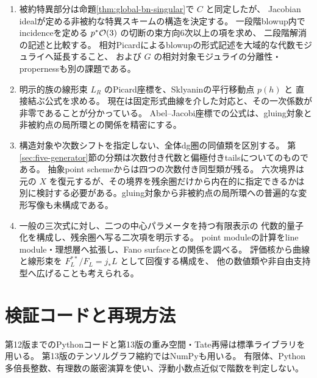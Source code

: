 \begin{enumerate}
 \item 被約特異部分は命題\ref{thm:global-bn-singular}で $C$ と同定したが、
 Jacobian idealが定める非被約な特異スキームの構造を決定する。
 一段階blowup内でincidenceを定める $p^*\mathcal O(3)$ の切断の束方向6次以上の項を求め、
 二段階解消の記述と比較する。
 相対Picardによるblowupの形式記述を大域的な代数モジュライへ延長すること、
 および $G$ の相対対象モジュライの分離性・propernessも別の課題である。
 \item 明示的族の線形束 $L_R$ のPicard座標を、Sklyaninの平行移動点 $p(h)$ と
 直接結ぶ公式を求める。
 現在は固定形式曲線を介した対応と、その一次係数が非零であることが分かっている。
 Abel--Jacobi座標での公式は、gluing対象と非被約点の局所環との関係を精密にする。
 \item 構造対象や次数シフトを指定しない、全体dg圏の同値類を区別する。
 第\ref{sec:five-generator}節の分類は次数付き代数と偏極付きtailsについてのものである。
 抽象point schemeからは四つの次数付き同型類が残る。
 六次境界は元の $X$ を復元するが、その境界を残余圏だけから内在的に指定できるかは
 別に検討する必要がある。gluing対象から非被約点の局所環への普遍的な変形写像も未構成である。
 \item 一般の三次式に対し、二つの中心パラメータを持つ有限表示の
 代数的量子化を構成し、残余圏へ写る二次項を明示する。
 point moduleの計算をline module・理想層へ拡張し、Fano surfaceとの関係を調べる。
 評価核から曲線と線形束を $F_L^{**}/F_L=j_*L$ として回復する構成を、
 他の数値類や非自由支持型へ広げることも考えられる。
\end{enumerate}

\clearpage
\appendix
\section{検証コードと再現方法}

第12版までのPythonコードと第13版の重み空間・Tate再帰は標準ライブラリを用いる。
第13版のテンソルグラフ縮約ではNumPyも用いる。
有限体、Python多倍長整数、有理数の厳密演算を使い、浮動小数点近似で階数を判定しない。

